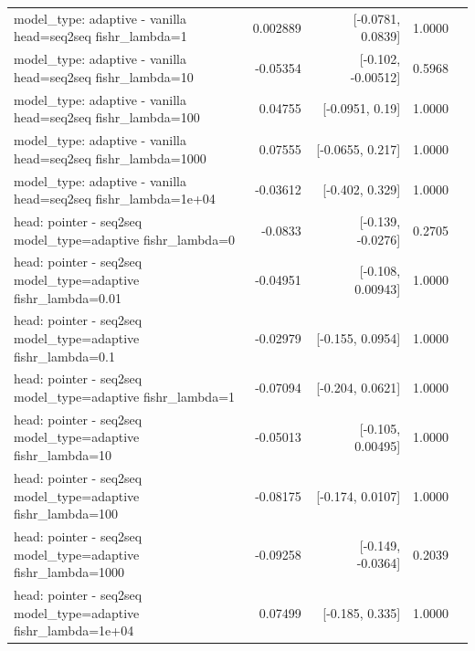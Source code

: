 \documentclass[10pt]{article}
\makeatletter
\newcommand{\stackcell}[1]{\begin{tabular}[t]{@{}l@{}}#1\end{tabular}}
\makeatother
\begin{document}
{\begin{longtable}{lrrrl}
\stackcell{model\_type: adaptive - vanilla\\\footnotesize head=seq2seq fishr\_lambda=1 } & 0.002889 & [-0.0781, 0.0839] & 1.0000 & \\
\stackcell{model\_type: adaptive - vanilla\\\footnotesize head=seq2seq fishr\_lambda=10 } & -0.05354 & [-0.102, -0.00512] & 0.5968 & \\
\stackcell{model\_type: adaptive - vanilla\\\footnotesize head=seq2seq fishr\_lambda=100 } & 0.04755 & [-0.0951, 0.19] & 1.0000 & \\
\stackcell{model\_type: adaptive - vanilla\\\footnotesize head=seq2seq fishr\_lambda=1000 } & 0.07555 & [-0.0655, 0.217] & 1.0000 & \\
\stackcell{model\_type: adaptive - vanilla\\\footnotesize head=seq2seq fishr\_lambda=1e+04 } & -0.03612 & [-0.402, 0.329] & 1.0000 & \\
\stackcell{head: pointer - seq2seq\\\footnotesize model\_type=adaptive fishr\_lambda=0 } & -0.0833 & [-0.139, -0.0276] & 0.2705 & \\
\stackcell{head: pointer - seq2seq\\\footnotesize model\_type=adaptive fishr\_lambda=0.01 } & -0.04951 & [-0.108, 0.00943] & 1.0000 & \\
\stackcell{head: pointer - seq2seq\\\footnotesize model\_type=adaptive fishr\_lambda=0.1 } & -0.02979 & [-0.155, 0.0954] & 1.0000 & \\
\stackcell{head: pointer - seq2seq\\\footnotesize model\_type=adaptive fishr\_lambda=1 } & -0.07094 & [-0.204, 0.0621] & 1.0000 & \\
\stackcell{head: pointer - seq2seq\\\footnotesize model\_type=adaptive fishr\_lambda=10 } & -0.05013 & [-0.105, 0.00495] & 1.0000 & \\
\stackcell{head: pointer - seq2seq\\\footnotesize model\_type=adaptive fishr\_lambda=100 } & -0.08175 & [-0.174, 0.0107] & 1.0000 & \\
\stackcell{head: pointer - seq2seq\\\footnotesize model\_type=adaptive fishr\_lambda=1000 } & -0.09258 & [-0.149, -0.0364] & 0.2039 & \\
\stackcell{head: pointer - seq2seq\\\footnotesize model\_type=adaptive fishr\_lambda=1e+04 } & 0.07499 & [-0.185, 0.335] & 1.0000 & \\

\end{longtable}}
\end{document}
